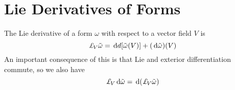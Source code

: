 \section{Lie Derivatives of Forms}
\label{sec:lie-deriv-forms}

The Lie derivative of a form $\omega$ with respect to a vector field
$V$ is
\begin{equation}
  \label{eq:57}
  \ld{V}{\of{\omega}} = \dd{d}[\of{\omega}(V)] + (\dd{\of{\omega}})(V)
\end{equation}
An important consequence of this is that Lie and exterior
differentiation commute, so we also have
\begin{equation}
  \label{eq:58}
  \ld{V}{\dd{\of{\omega}}} = \dd{(\ld{V}{\of{\omega}})}
\end{equation}

